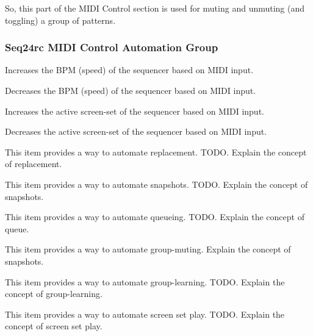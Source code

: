    So, this part of the MIDI Control section is used for muting and unmuting
   (and toggling) a group of patterns.

\subsubsection{Seq24rc MIDI Control Automation Group}
\label{subsubsec:seq24_rc_file_midi_control_automation_group}


   \setcounter{ItemCounter}{0}      %

   Increases the BPM (speed) of the sequencer based on MIDI input.

   Decreases the BPM (speed) of the sequencer based on MIDI input.

   Increases the active screen-set of the sequencer based on MIDI input.

   Decreases the active screen-set of the sequencer based on MIDI input.

   This item provides a way to automate replacement.
   TODO.
   Explain the concept of replacement.

   This item provides a way to automate snapshots.
   TODO.
   Explain the concept of snapshots.

   This item provides a way to automate queueing.
   TODO.
   Explain the concept of queue.

   This item provides a way to automate group-muting.
   Explain the concept of snapshots.

   This item provides a way to automate group-learning.
   TODO.
   Explain the concept of group-learning.

   This item provides a way to automate screen set play.
   TODO.
   Explain the concept of screen set play.

